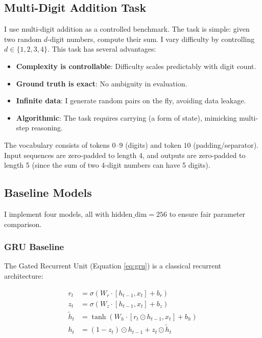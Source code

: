 \documentclass[11pt]{article}
\begin{document}
\subsection{Multi-Digit Addition Task}

I use multi-digit addition as a controlled benchmark. The task is simple: given two random $d$-digit numbers, compute their sum. I vary difficulty by controlling $d \in \{1, 2, 3, 4\}$. This task has several advantages:

\begin{itemize}
    \item \textbf{Complexity is controllable}: Difficulty scales predictably with digit count.
    \item \textbf{Ground truth is exact}: No ambiguity in evaluation.
    \item \textbf{Infinite data}: I generate random pairs on the fly, avoiding data leakage.
    \item \textbf{Algorithmic}: The task requires carrying (a form of state), mimicking multi-step reasoning.
\end{itemize}

The vocabulary consists of tokens $0$–$9$ (digits) and token $10$ (padding/separator). Input sequences are zero-padded to length 4, and outputs are zero-padded to length 5 (since the sum of two 4-digit numbers can have 5 digits).

\subsection{Baseline Models}

I implement four models, all with $\text{hidden\_dim} = 256$ to ensure fair parameter comparison.

\subsubsection{GRU Baseline\cite{Cho2014}}

The Gated Recurrent Unit (Equation \ref{eq:gru}) is a classical recurrent architecture:

\begin{equation}
\label{eq:gru}
\begin{aligned}
r_t &= \sigma(W_r \cdot [h_{t-1}, x_t] + b_r) \\
z_t &= \sigma(W_z \cdot [h_{t-1}, x_t] + b_z) \\
\tilde{h}_t &= \tanh(W_h \cdot [r_t \odot h_{t-1}, x_t] + b_h) \\
h_t &= (1 - z_t) \odot h_{t-1} + z_t \odot \tilde{h}_t
\end{aligned}
\end{equation}
\end{document}
